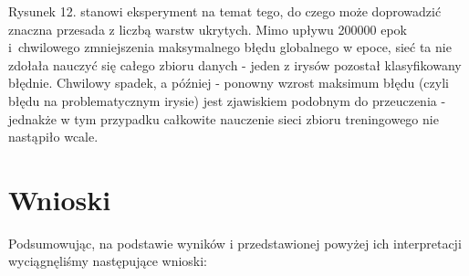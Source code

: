 \documentclass{classrep}
\begin{document}
Rysunek 12. stanowi eksperyment na temat tego, do czego może doprowadzić znaczna
przesada z liczbą warstw ukrytych. Mimo upływu 200000 epok i~chwilowego
zmniejszenia maksymalnego błędu globalnego w epoce, sieć ta nie zdołała
nauczyć się całego zbioru danych - jeden z irysów pozostał klasyfikowany błędnie.
Chwilowy spadek, a później - ponowny wzrost maksimum błędu (czyli błędu
na problematycznym irysie) jest zjawiskiem podobnym do przeuczenia - jednakże
w tym przypadku całkowite nauczenie sieci zbioru treningowego nie
nastąpiło wcale. \\

\section{Wnioski}
Podsumowując, na podstawie wyników i przedstawionej powyżej ich interpretacji
wyciągnęliśmy następujące wnioski:
\end{document}
